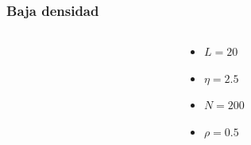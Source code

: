 \begin{frame}
\frametitle{Baja densidad}

\begin{columns}
    \begin{column}{0.7\textwidth}
      \begin{center}
\end{center}
    \end{column}
    \begin{column}{0.3\textwidth}
\begin{center}
            \footnotesize
        \begin{itemize}
        \item \(L = 20\)
        \item \(\eta = 2.5\)
        \item \(N = 200\)
        \item \(\rho = 0.5\)
        \end{itemize}
\end{center}
    \end{column}
\end{columns}
\end{frame}

